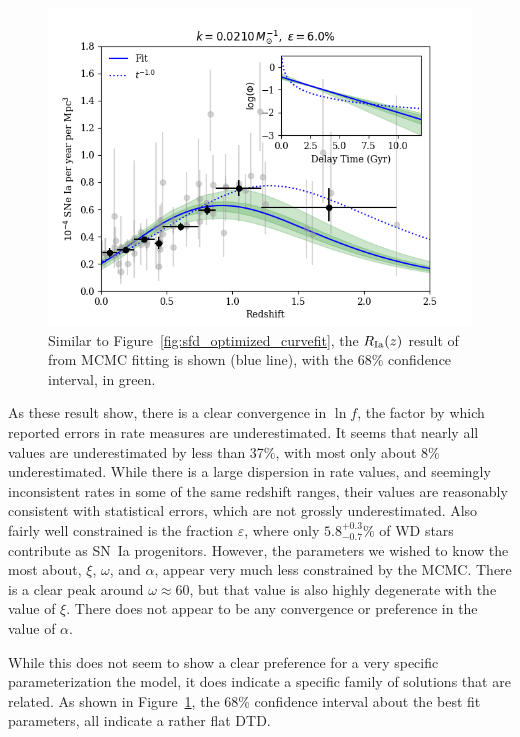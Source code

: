 \documentclass[apj]{aastex62}
\begin{document}
\begin{figure}[t] %
   \centering
   \includegraphics[width=6.5in]{figure_fit_demo_werr} 
   \caption{\footnotesize Similar to Figure~\ref{fig:sfd_optimized_curvefit}, the $R_{\rm Ia}(z)$ result of from MCMC fitting is shown (blue line), with the 68\% confidence interval, in green. }
   \label{fig:figure_fit_demo_werr}
\end{figure}

As these result show, there is a clear convergence in $\ln f$, the factor by which reported errors in rate measures are underestimated. It seems that nearly all values are underestimated by less than 37\%, with most only about 8\% underestimated. While there is a large dispersion in rate values, and seemingly inconsistent rates in some of the same redshift ranges, their values are reasonably consistent with statistical errors, which are not grossly underestimated. Also fairly well constrained is the fraction $\varepsilon$, where only $5.8^{+0.3}_{-0.7}\%$ of WD stars contribute as SN~Ia progenitors. However, the parameters we wished to know the most about,  $\xi$, $\omega$, and $\alpha$, appear very much less constrained by the MCMC. There is a clear peak around $\omega\approx60$, but that value is also highly degenerate with the value of $\xi$.  There does not appear to be any convergence or preference in the value of $\alpha$.


While this does not seem to show a clear preference for a very specific parameterization the model, it does indicate a specific family of solutions that are related. As shown in Figure~\ref{fig:figure_fit_demo_werr}, the 68\% confidence interval about the best fit parameters, all indicate a rather flat DTD. %
\end{document}
